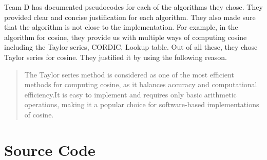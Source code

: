 \begin{flushleft}
    Team D has documented pseudocodes for each of the algorithms they chose. They provided clear and concise justification for each algorithm.
    They also made sure that the algorithm is not close to the implementation.
    For example, in the algorithm for cosine, they provide us with multiple ways of computing cosine including the Taylor series, CORDIC, Lookup table. Out of all these, they chose Taylor series for cosine. They justified it by using the following reason.
    \begin{quote}
        The Taylor series method is considered as one of the most efficient methods for computing cosine,
as it balances accuracy and computational efficiency.It is easy to implement and requires only basic arithmetic
operations, making it a popular choice for software-based implementations of cosine.

    \end{quote}
\end{flushleft}
\section{Source Code}
